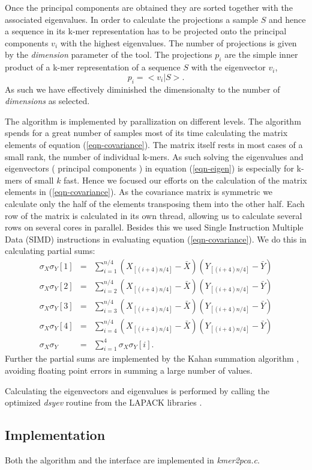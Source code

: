 Once the principal components are obtained they are sorted together
with the associated eigenvalues. In order to calculate the projections
a sample $S$ and hence a sequence in its k-mer representation has to be
projected onto the principal components $v_i$ with the highest
eigenvalues. The number of projections is given by the
\emph{dimension} parameter of the tool. The projections $p_i$ are the simple
inner product of a k-mer representation of a sequence $S$ with the
eigenvector $v_i$,
\begin{equation}
  p_i = <v_i|S>.
\end{equation}
As such we have effectively diminished the dimensionalty to the number of
\emph{dimensions} as selected.

The algorithm is implemented by parallization on different
levels. The algorithm spends for a great number of samples most of its
time calculating the matrix elements of equation
(\ref{eqn-covariance}). The matrix itself rests in most cases
of a small rank, the number of individual k-mers. As such solving the
eigenvalues and eigenvectors ( principal components ) in equation
(\ref{eqn-eigen}) is especially for k-mers of small $k$ fast. Hence we
focused our efforts on the calculation of the matrix elements in
(\ref{eqn-covariance}). As the covariance matrix is symmetric we
calculate only the half of the elements transposing them into the
other half. Each row of the matrix is calculated in its own thread,
allowing us to calculate several rows on several cores in
parallel. Besides this we used Single Instruction Multiple Data (SIMD)
instructions in evaluating equation (\ref{eqn-covariance}). We do this
in calculating partial sums:
\begin{eqnarray}
  \sigma_X
  \sigma_Y[1]&=&\sum_{i=1}^{n/4}(X_{[(i+4)n/4]}-\bar{X})(Y_{[(i+4)n/4]}-\bar{Y}) \\
  \sigma_X
  \sigma_Y[2]&=&\sum_{i=2}^{n/4}(X_{[(i+4)n/4]}-\bar{X})(Y_{[(i+4)n/4]}-\bar{Y}) \\
  \sigma_X
  \sigma_Y[3]&=&\sum_{i=3}^{n/4}(X_{[(i+4)n/4]}-\bar{X})(Y_{[(i+4)n/4]}-\bar{Y}) \\
  \sigma_X
  \sigma_Y[4]&=&\sum_{i=4}^{n/4}(X_{[(i+4)n/4]}-\bar{X})(Y_{[(i+4)n/4]}-\bar{Y}) \\
  \sigma_X
  \sigma_Y &=& \sum_{i=1}^4\sigma_X\sigma_Y[i].
\end{eqnarray}
Further the partial sums are implemented by the Kahan summation
algorithm \cite{kahan}, avoiding floating point errors in summing a
large number of values.

Calculating the eigenvectors and eigenvalues is performed by calling
the optimized \emph{dsyev} routine from the LAPACK libraries \cite{lapack}.

\subsection{Implementation}

Both the algorithm and the interface are implemented in \emph{kmer2pca.c}.
